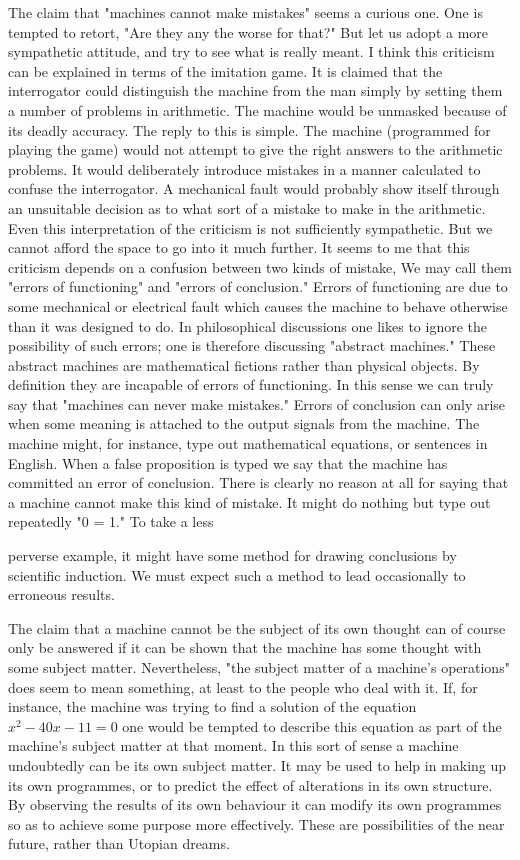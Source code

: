 \documentclass{article}
\begin{document}
The claim that "machines cannot make mistakes" seems a curious one. One is tempted to retort, "Are they any the worse for that?" But let us adopt a more sympathetic attitude, and try to see what is really meant. I think this criticism can be explained in terms of the imitation game. It is claimed that the interrogator could distinguish the machine from the man simply by setting them a number of problems in arithmetic. The machine would be unmasked because of its deadly accuracy. The reply to this is simple. The machine (programmed for playing the game) would not attempt to give the right answers to the arithmetic problems. It would deliberately introduce mistakes in a manner calculated to confuse the interrogator. A mechanical fault would probably show itself through an unsuitable decision as to what sort of a mistake to make in the arithmetic. Even this interpretation of the criticism is not sufficiently sympathetic. But we cannot afford the space to go into it much further. It seems to me that this criticism depends on a confusion between two kinds of mistake, We may call them "errors of functioning" and "errors of conclusion." Errors of functioning are due to some mechanical or electrical fault which causes the machine to behave otherwise than it was designed to do. In philosophical discussions one likes to ignore the possibility of such errors; one is therefore discussing "abstract machines." These abstract machines are mathematical fictions rather than physical objects. By definition they are incapable of errors of functioning. In this sense we can truly say that "machines can never make mistakes." Errors of conclusion can only arise when some meaning is attached to the output signals from the machine. The machine might, for instance, type out mathematical equations, or sentences in English. When a false proposition is typed we say that the machine has committed an error of conclusion. There is clearly no reason at all for saying that a machine cannot make this kind of mistake. It might do nothing but type out repeatedly "0 = 1." To take a less

perverse example, it might have some method for drawing conclusions by scientific induction. We must expect such a method to lead occasionally to erroneous results.

The claim that a machine cannot be the subject of its own thought can of course only be answered if it can be shown that the machine has some thought with some subject matter. Nevertheless, "the subject matter of a machine's operations" does seem to mean something, at least to the people who deal with it. If, for instance, the machine was trying to find a solution of the equation $x^2 - 40x - 11 = 0$ one would be tempted to describe this equation as part of the machine's subject matter at that moment. In this sort of sense a machine undoubtedly can be its own subject matter. It may be used to help in making up its own programmes, or to predict the effect of alterations in its own structure. By observing the results of its own behaviour it can modify its own programmes so as to achieve some purpose more effectively. These are possibilities of the near future, rather than Utopian dreams.
\end{document}
